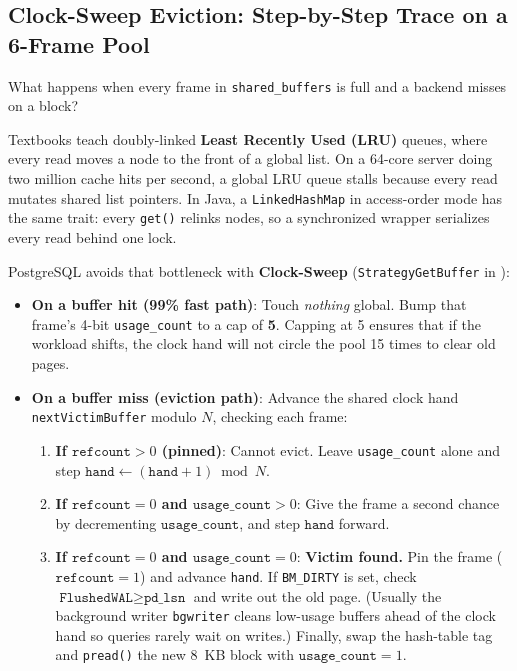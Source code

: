 \subsection{Clock-Sweep Eviction: Step-by-Step Trace on a 6-Frame Pool}

What happens when every frame in \texttt{shared\_buffers} is full and a backend misses on a block?

Textbooks teach doubly-linked \textbf{Least Recently Used (LRU)} queues, where every read moves a node to the front of a global list. On a 64-core server doing two million cache hits per second, a global LRU queue stalls because every read mutates shared list pointers. In Java, a \texttt{LinkedHashMap} in access-order mode has the same trait: every \texttt{get()} relinks nodes, so a synchronized wrapper serializes every read behind one lock.

PostgreSQL avoids that bottleneck with \textbf{Clock-Sweep} (\texttt{StrategyGetBuffer} in ):
\begin{itemize}
  \item \textbf{On a buffer hit (99\% fast path)}: Touch \emph{nothing} global. Bump that frame's 4-bit \texttt{usage\_count} to a cap of \textbf{5}. Capping at 5 ensures that if the workload shifts, the clock hand will not circle the pool 15 times to clear old pages.
  \item \textbf{On a buffer miss (eviction path)}: Advance the shared clock hand \texttt{nextVictimBuffer} modulo $N$, checking each frame:
  \begin{enumerate}
    \item \textbf{If $\texttt{refcount} > 0$ (pinned)}: Cannot evict. Leave \texttt{usage\_count} alone and step $\texttt{hand} \leftarrow (\texttt{hand} + 1) \bmod N$.
    \item \textbf{If $\texttt{refcount} = 0$ and $\texttt{usage\_count} > 0$}: Give the frame a second chance by decrementing $\texttt{usage\_count}$, and step $\texttt{hand}$ forward.
    \item \textbf{If $\texttt{refcount} = 0$ and $\texttt{usage\_count} = 0$}: \textbf{Victim found.} Pin the frame ($\texttt{refcount} = 1$) and advance \texttt{hand}. If \texttt{BM\_DIRTY} is set, check $\texttt{FlushedWAL} \ge \texttt{pd\_lsn}$ and write out the old page. (Usually the background writer \texttt{bgwriter} cleans low-usage buffers ahead of the clock hand so queries rarely wait on writes.) Finally, swap the hash-table tag and \texttt{pread()} the new 8~KB block with $\texttt{usage\_count} = 1$.
  \end{enumerate}
\end{itemize}

